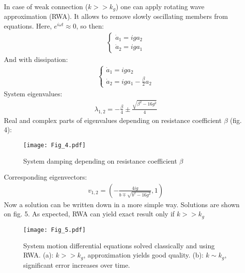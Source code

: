 \documentclass[]{article}
\begin{document}
In case of weak connection ($k>>k_g$) one can apply rotating wave approximation (RWA). It allows to remove slowly oscillating members from equations. Here, $e^{i\omega t} \approx 0$, so then:
\begin{align*}
	\begin{cases}
		\dot a_1 = iga_2
		\\
		\dot a_2 = iga_1
	\end{cases}
\end{align*}
And with dissipation:
\begin{align*}
	\begin{cases}
		\dot a_1 = iga_2
		\\
		\dot a_2 = iga_1 - \frac{\beta}{2}a_2 
	\end{cases}
\end{align*}
System eigenvalues:
\begin{align*}
	\lambda_{1,2} = -\frac{\beta}{4} \pm \frac{\sqrt{\beta^2-16g^2}}{4}
\end{align*}
Real and complex parts of eigenvalues depending on resistance coefficient $\beta$ (fig. 4):
\begin{figure}[h]
	\centering
	\texttt{[image: Fig\_4.pdf]}
	\caption{System damping depending on resistance coefficient $\beta$}
\end{figure}\newline
Corresponding eigenvectors:
\begin{align*}
		v_{1,2} = \left(-\frac{4ig}{b \mp \sqrt{b^2-16g^2}}, 1	\right)
\end{align*}
Now a solution can be written down in a more simple way. Solutions are shown on fig. 5. As expected, RWA can yield exact result only if $k>>k_g$
\begin{figure}[h]
	\centering
	\texttt{[image: Fig\_5.pdf]}
	\caption{System motion differential equations solved classically and using RWA. (a): {$k>>k_g$}, approximation yields good quality. (b): {$k \sim k_g$}, significant error increases over time.}
\end{figure}
\end{document}
